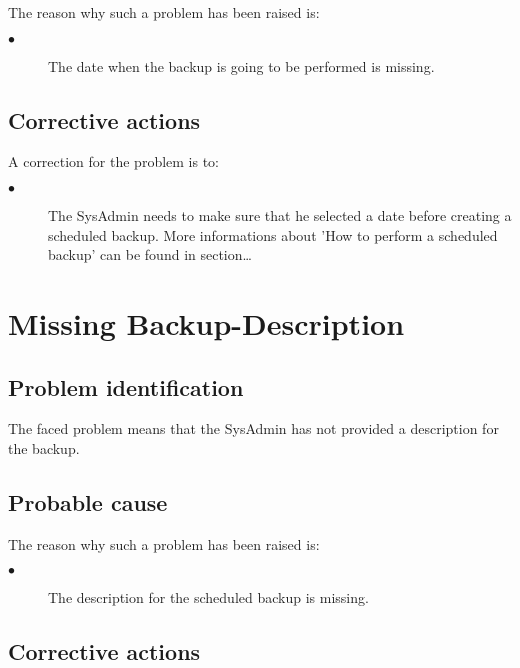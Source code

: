 The reason why such a problem has been raised is:\\
\begin{description}
\item[$\bullet$] The date when the backup is going to be performed is missing.
\end{description}


\subsection{Corrective actions}

A correction for the problem is to:\\
\begin{description}
\item[$\bullet$] The SysAdmin needs to make sure that he selected a date before
creating a scheduled backup. More informations about 'How to perform a scheduled
backup' can be found in section\ldots

\end{description}







\section{Missing Backup-Description} 

\subsection{Problem identification}
The faced problem means that the SysAdmin has not provided a description for
the backup.

\subsection{Probable cause}

The reason why such a problem has been raised is:\\
\begin{description}
\item[$\bullet$] The description for the scheduled backup is missing.
\end{description}


\subsection{Corrective actions}

